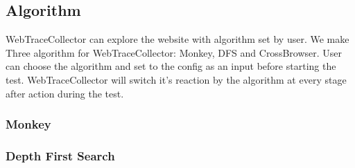 
\subsection{Algorithm}

WebTraceCollector can explore the website with algorithm set by user.
We make Three algorithm for WebTraceCollector: Monkey, DFS and CrossBrowser.
User can choose the algorithm and set to the config as an input before starting the test.
WebTraceCollector will switch it's reaction by the algorithm at every stage after action during the test.


\subsubsection{Monkey}


\subsubsection{Depth First Search}
